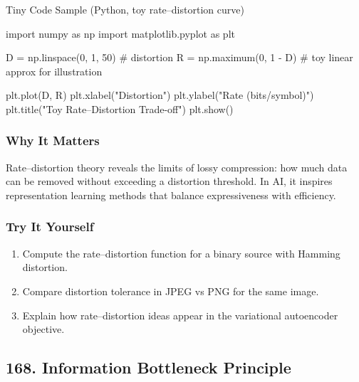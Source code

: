 \documentclass[
  letterpaper,
  DIV=11,
  numbers=noendperiod]{scrreprt}
\newenvironment{Shaded}{\begin{snugshade}}{\end{snugshade}}
\newcommand{\CommentTok}[1]{\textcolor[rgb]{0.37,0.37,0.37}{#1}}
\newcommand{\DecValTok}[1]{\textcolor[rgb]{0.68,0.00,0.00}{#1}}
\newcommand{\ImportTok}[1]{\textcolor[rgb]{0.00,0.46,0.62}{#1}}
\newcommand{\NormalTok}[1]{\textcolor[rgb]{0.00,0.23,0.31}{#1}}
\newcommand{\OperatorTok}[1]{\textcolor[rgb]{0.37,0.37,0.37}{#1}}
\newcommand{\StringTok}[1]{\textcolor[rgb]{0.13,0.47,0.30}{#1}}
\providecommand{\tightlist}{%
  \setlength{\itemsep}{0pt}\setlength{\parskip}{0pt}}
\begin{document}
Tiny Code Sample (Python, toy rate--distortion curve)

\begin{Shaded}
\begin{Highlighting}[]
\ImportTok{import}\NormalTok{ numpy }\ImportTok{as}\NormalTok{ np}
\ImportTok{import}\NormalTok{ matplotlib.pyplot }\ImportTok{as}\NormalTok{ plt}

\NormalTok{D }\OperatorTok{=}\NormalTok{ np.linspace(}\DecValTok{0}\NormalTok{, }\DecValTok{1}\NormalTok{, }\DecValTok{50}\NormalTok{)  }\CommentTok{\# distortion}
\NormalTok{R }\OperatorTok{=}\NormalTok{ np.maximum(}\DecValTok{0}\NormalTok{, }\DecValTok{1} \OperatorTok{{-}}\NormalTok{ D)   }\CommentTok{\# toy linear approx for illustration}

\NormalTok{plt.plot(D, R)}
\NormalTok{plt.xlabel(}\StringTok{"Distortion"}\NormalTok{)}
\NormalTok{plt.ylabel(}\StringTok{"Rate (bits/symbol)"}\NormalTok{)}
\NormalTok{plt.title(}\StringTok{"Toy Rate–Distortion Trade{-}off"}\NormalTok{)}
\NormalTok{plt.show()}
\end{Highlighting}
\end{Shaded}

\subsubsection{Why It Matters}\label{why-it-matters-64}

Rate--distortion theory reveals the limits of lossy compression: how
much data can be removed without exceeding a distortion threshold. In
AI, it inspires representation learning methods that balance
expressiveness with efficiency.

\subsubsection{Try It Yourself}\label{try-it-yourself-166}

\begin{enumerate}
\def\labelenumi{\arabic{enumi}.}
\tightlist
\item
  Compute the rate--distortion function for a binary source with Hamming
  distortion.
\item
  Compare distortion tolerance in JPEG vs PNG for the same image.
\item
  Explain how rate--distortion ideas appear in the variational
  autoencoder objective.
\end{enumerate}

\subsection{168. Information Bottleneck
Principle}\label{information-bottleneck-principle}
\end{document}
